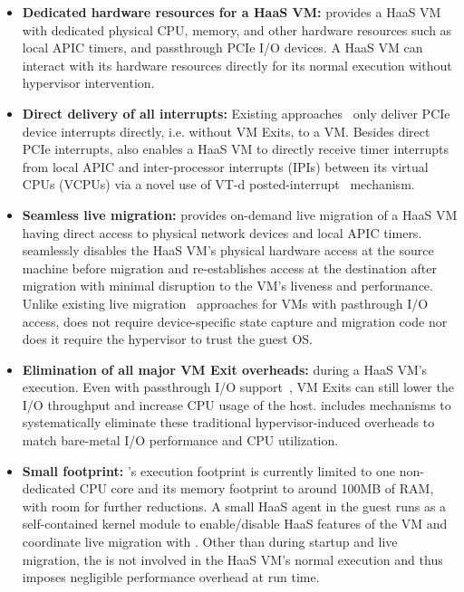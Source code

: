 \begin{itemize} 
\parskip 0mm
\itemsep 0mm

\item {\bf Dedicated hardware resources for a HaaS VM:} \na provides a HaaS VM with 
dedicated physical CPU, memory, and other hardware resources such as 
local APIC timers, and passthrough PCIe I/O devices. 
A HaaS VM can interact with its hardware resources
directly for its normal execution without hypervisor intervention.


\item {\bf Direct delivery of all interrupts:}
Existing approaches~\cite{amit:2015,tu:2015}
only deliver PCIe device interrupts directly, i.e. without VM Exits, to a VM.
Besides direct PCIe interrupts, \na also enables
a HaaS VM to directly receive
timer interrupts from local APIC and inter-processor interrupts (IPIs) 
between its virtual CPUs (VCPUs) via a novel use of VT-d 
posted-interrupt~\cite{postedinterrupt} mechanism.


\item {\bf Seamless live migration:}
\na provides on-demand live migration of a HaaS VM having direct access to 
physical network devices and local APIC timers. 
\na seamlessly disables the HaaS VM's physical hardware access at the 
source machine before migration and 
re-establishes access at the destination after migration
with minimal disruption to the VM's liveness and performance.
Unlike existing live migration~\cite{vfio-live-migration,blmvisor-journal,ondemand} approaches for VMs with pasthrough 
I/O access, \na does not require device-specific state capture and migration code 
nor does it require the hypervisor to trust the guest OS. 

\item {\bf Elimination of all major VM Exit overheads:}  during a HaaS VM's execution. 
Even with passthrough I/O support~\cite{intelvtd-paper,intelvtd-manual}, 
VM Exits can still lower the I/O throughput and increase CPU usage of the host.
\na includes mechanisms to systematically eliminate
these traditional hypervisor-induced overheads to match bare-metal I/O performance and CPU utilization.

\item {\bf Small footprint:} 
\sna's execution footprint is currently limited to one non-dedicated 
CPU core and its memory footprint to around 100MB of RAM, with room for further reductions.
A small HaaS agent in the guest runs as a self-contained kernel module
to enable/disable HaaS features of the VM and coordinate live migration with \sna.
Other than during startup and live migration, the \na is not involved in the
HaaS VM's normal execution and thus imposes negligible performance overhead at run time.  

\end{itemize}

